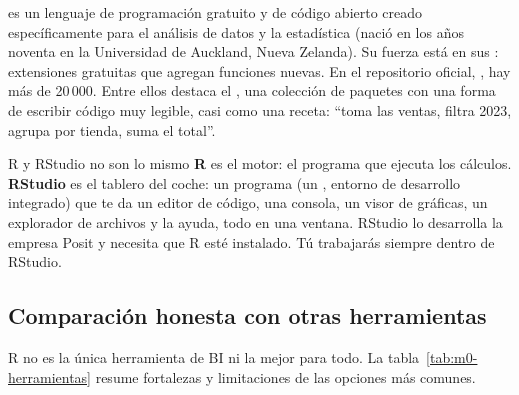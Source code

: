  es un lenguaje de programación gratuito y de código abierto
creado específicamente para el análisis de datos y la estadística (nació en
los años noventa en la Universidad de Auckland, Nueva Zelanda). Su fuerza
está en sus : extensiones gratuitas que agregan funciones
nuevas. En el repositorio oficial, , hay más de 20\,000. Entre
ellos destaca el , una colección de paquetes con una
forma de escribir código muy legible, casi como una receta: ``toma las
ventas, filtra 2023, agrupa por tienda, suma el total''.

\begin{concepto}{R y RStudio no son lo mismo}
\textbf{R} es el motor: el programa que ejecuta los cálculos.
\textbf{RStudio} es el tablero del coche: un programa (un ,
entorno de desarrollo integrado) que te da un editor de código, una
consola, un visor de gráficas, un explorador de archivos y la ayuda, todo en
una ventana. RStudio lo desarrolla la empresa Posit y necesita que R esté
instalado. Tú trabajarás siempre dentro de RStudio.
\end{concepto}

\subsection{Comparación honesta con otras herramientas}

R no es la única herramienta de BI ni la mejor para todo. La
tabla~\ref{tab:m0-herramientas} resume fortalezas y limitaciones de las
opciones más comunes.

